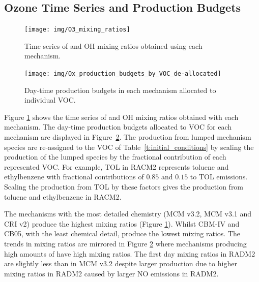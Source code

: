 
\subsection[O3 Time Series and Ox Production Budgets]{Ozone Time Series and  Production Budgets} \label{ss:O3_time_series}

\begin{figure}
    \centering
    \texttt{[image: img/O3\_mixing\_ratios]}
    \vspace{1mm}
    \caption{Time series of  and OH mixing ratios obtained using each mechanism.}
    \vspace{-4mm}
    \label{f:time_series}
\end{figure}

\begin{figure}
    \centering
    \texttt{[image: img/Ox\_production\_budgets\_by\_VOC\_de-allocated]}
    \vspace{1mm}
    \caption{Day-time  production budgets in each mechanism allocated to individual VOC.}
    \vspace{-4mm}
    \label{f:Ox_tagged_budgets}
\end{figure}

Figure \ref{f:time_series} shows the time series of  and OH mixing ratios obtained with each mechanism.
The day-time  production budgets allocated to VOC for each mechanism are displayed in \mbox{Figure \ref{f:Ox_tagged_budgets}}.
The  production from lumped mechanism species are re-assigned to the VOC of \mbox{Table \ref{t:initial_conditions}} by scaling the  production of the lumped species by the fractional contribution of each represented VOC.
For example, TOL in RACM2 represents toluene and ethylbenzene with fractional contributions of $0.85$ and $0.15$ to TOL emissions.
Scaling the  production from TOL by these factors gives the  production from toluene and ethylbenzene in RACM2.

The mechanisms with the most detailed chemistry (MCM v3.2, MCM v3.1 and CRI v2) produce the highest  mixing ratios (Figure \ref{f:time_series}).
Whilst CBM-IV and CB05, with the least chemical detail, produce the lowest  mixing ratios.
The trends in  mixing ratios are mirrored in Figure \ref{f:Ox_tagged_budgets} where mechanisms producing high amounts of  have high  mixing ratios.
The first day  mixing ratios in RADM2 are slightly less than in MCM v3.2 despite larger  production due to higher  mixing ratios in RADM2 caused by larger NO emissions in RADM2.

